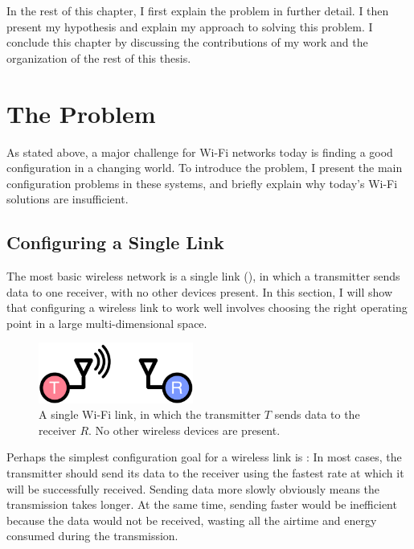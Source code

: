 In the rest of this chapter, I first explain the problem in further detail. I then present my hypothesis and explain my approach to solving this problem. I conclude this chapter by discussing the contributions of my work and the organization of the rest of this thesis.

\section{The Problem}
\label{sec:intro_problem}
As stated above, a major challenge for Wi-Fi networks today is finding a good configuration in a changing world. To introduce the problem, I present the main configuration problems in these systems, and briefly explain why today's Wi-Fi solutions are insufficient.

\subsection{Configuring a Single Link}
\label{sec:intro_single_link_problems}
The most basic wireless network is a single link (), in which a transmitter sends data to one receiver, with no other devices present. In this section, I will show that configuring a wireless link to work well involves choosing the right operating point in a large multi-dimensional space. 

\begin{figure}[tp]
	\centering
	\includegraphics[width=2in]{figures/introduction/single_link_circle.pdf}
	\caption[A single Wi-Fi link]{\label{fig:wifi_link}A single Wi-Fi link, in which the transmitter $T$ sends data to the receiver $R$. No other wireless devices are present.}
\end{figure}

Perhaps the simplest configuration goal for a wireless link is : In most cases, the transmitter should send its data to the receiver using the fastest rate at which it will be successfully received. Sending data more slowly obviously means the transmission takes longer. At the same time, sending faster would be inefficient because the data would not be received, wasting all the airtime and energy consumed during the transmission.

